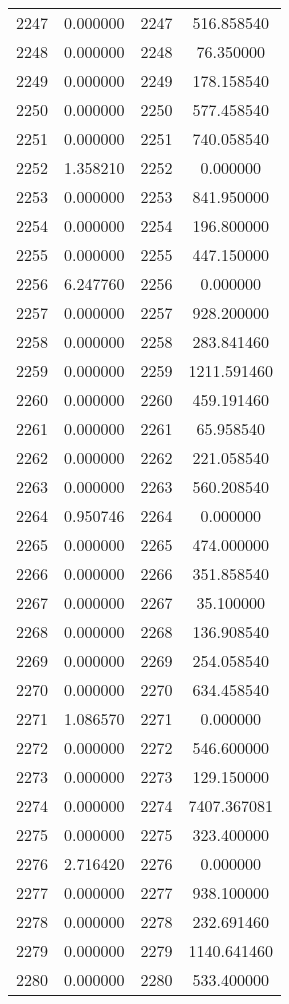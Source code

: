 \documentclass[12pt]{article}
\begin{document}
\begin{longtable}{@{}cccc@{}}
2247 & 0.000000 & 2247 & 516.858540 \\
2248 & 0.000000 & 2248 & 76.350000 \\
2249 & 0.000000 & 2249 & 178.158540 \\
2250 & 0.000000 & 2250 & 577.458540 \\
2251 & 0.000000 & 2251 & 740.058540 \\
2252 & 1.358210 & 2252 & 0.000000 \\
2253 & 0.000000 & 2253 & 841.950000 \\
2254 & 0.000000 & 2254 & 196.800000 \\
2255 & 0.000000 & 2255 & 447.150000 \\
2256 & 6.247760 & 2256 & 0.000000 \\
2257 & 0.000000 & 2257 & 928.200000 \\
2258 & 0.000000 & 2258 & 283.841460 \\
2259 & 0.000000 & 2259 & 1211.591460 \\
2260 & 0.000000 & 2260 & 459.191460 \\
2261 & 0.000000 & 2261 & 65.958540 \\
2262 & 0.000000 & 2262 & 221.058540 \\
2263 & 0.000000 & 2263 & 560.208540 \\
2264 & 0.950746 & 2264 & 0.000000 \\
2265 & 0.000000 & 2265 & 474.000000 \\
2266 & 0.000000 & 2266 & 351.858540 \\
2267 & 0.000000 & 2267 & 35.100000 \\
2268 & 0.000000 & 2268 & 136.908540 \\
2269 & 0.000000 & 2269 & 254.058540 \\
2270 & 0.000000 & 2270 & 634.458540 \\
2271 & 1.086570 & 2271 & 0.000000 \\
2272 & 0.000000 & 2272 & 546.600000 \\
2273 & 0.000000 & 2273 & 129.150000 \\
2274 & 0.000000 & 2274 & 7407.367081 \\
2275 & 0.000000 & 2275 & 323.400000 \\
2276 & 2.716420 & 2276 & 0.000000 \\
2277 & 0.000000 & 2277 & 938.100000 \\
2278 & 0.000000 & 2278 & 232.691460 \\
2279 & 0.000000 & 2279 & 1140.641460 \\
2280 & 0.000000 & 2280 & 533.400000 \\

\end{longtable}
\end{document}
